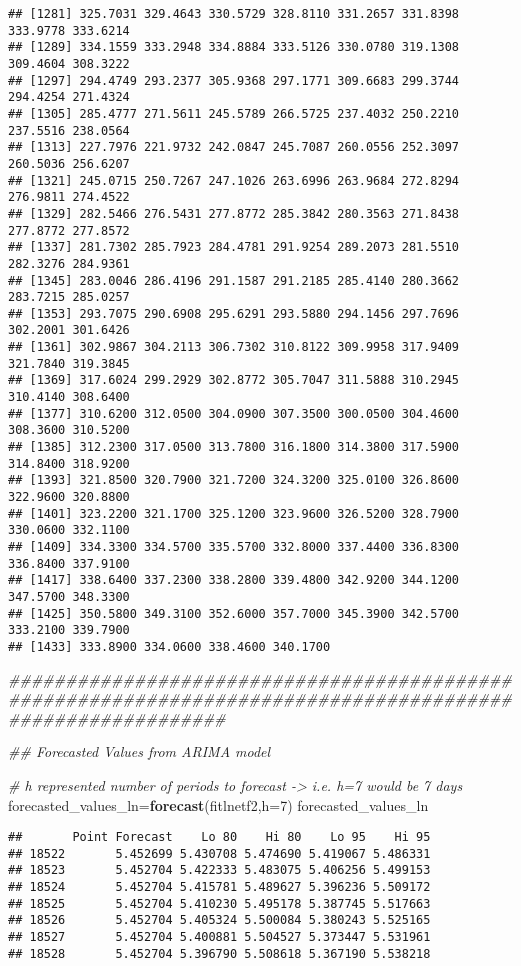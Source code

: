 \documentclass[
]{article}
\newenvironment{Shaded}{\begin{snugshade}}{\end{snugshade}}
\newcommand{\CommentTok}[1]{\textcolor[rgb]{0.56,0.35,0.01}{\textit{#1}}}
\newcommand{\DataTypeTok}[1]{\textcolor[rgb]{0.13,0.29,0.53}{#1}}
\newcommand{\DecValTok}[1]{\textcolor[rgb]{0.00,0.00,0.81}{#1}}
\newcommand{\KeywordTok}[1]{\textcolor[rgb]{0.13,0.29,0.53}{\textbf{#1}}}
\newcommand{\NormalTok}[1]{#1}
\begin{document}
\begin{verbatim}
## [1281] 325.7031 329.4643 330.5729 328.8110 331.2657 331.8398 333.9778 333.6214
## [1289] 334.1559 333.2948 334.8884 333.5126 330.0780 319.1308 309.4604 308.3222
## [1297] 294.4749 293.2377 305.9368 297.1771 309.6683 299.3744 294.4254 271.4324
## [1305] 285.4777 271.5611 245.5789 266.5725 237.4032 250.2210 237.5516 238.0564
## [1313] 227.7976 221.9732 242.0847 245.7087 260.0556 252.3097 260.5036 256.6207
## [1321] 245.0715 250.7267 247.1026 263.6996 263.9684 272.8294 276.9811 274.4522
## [1329] 282.5466 276.5431 277.8772 285.3842 280.3563 271.8438 277.8772 277.8572
## [1337] 281.7302 285.7923 284.4781 291.9254 289.2073 281.5510 282.3276 284.9361
## [1345] 283.0046 286.4196 291.1587 291.2185 285.4140 280.3662 283.7215 285.0257
## [1353] 293.7075 290.6908 295.6291 293.5880 294.1456 297.7696 302.2001 301.6426
## [1361] 302.9867 304.2113 306.7302 310.8122 309.9958 317.9409 321.7840 319.3845
## [1369] 317.6024 299.2929 302.8772 305.7047 311.5888 310.2945 310.4140 308.6400
## [1377] 310.6200 312.0500 304.0900 307.3500 300.0500 304.4600 308.3600 310.5200
## [1385] 312.2300 317.0500 313.7800 316.1800 314.3800 317.5900 314.8400 318.9200
## [1393] 321.8500 320.7900 321.7200 324.3200 325.0100 326.8600 322.9600 320.8800
## [1401] 323.2200 321.1700 325.1200 323.9600 326.5200 328.7900 330.0600 332.1100
## [1409] 334.3300 334.5700 335.5700 332.8000 337.4400 336.8300 336.8400 337.9100
## [1417] 338.6400 337.2300 338.2800 339.4800 342.9200 344.1200 347.5700 348.3300
## [1425] 350.5800 349.3100 352.6000 357.7000 345.3900 342.5700 333.2100 339.7900
## [1433] 333.8900 334.0600 338.4600 340.1700
\end{verbatim}

\begin{Shaded}
\begin{Highlighting}[]
\CommentTok{###########################################################################################################}
    
\CommentTok{## Forecasted Values from ARIMA model}

  \CommentTok{# h represented number of periods to forecast -> i.e. h=7 would be 7 days}
\NormalTok{    forecasted_values_ln=}\KeywordTok{forecast}\NormalTok{(fitlnetf2,}\DataTypeTok{h=}\DecValTok{7}\NormalTok{)}
\NormalTok{    forecasted_values_ln}
\end{Highlighting}
\end{Shaded}

\begin{verbatim}
##       Point Forecast    Lo 80    Hi 80    Lo 95    Hi 95
## 18522       5.452699 5.430708 5.474690 5.419067 5.486331
## 18523       5.452704 5.422333 5.483075 5.406256 5.499153
## 18524       5.452704 5.415781 5.489627 5.396236 5.509172
## 18525       5.452704 5.410230 5.495178 5.387745 5.517663
## 18526       5.452704 5.405324 5.500084 5.380243 5.525165
## 18527       5.452704 5.400881 5.504527 5.373447 5.531961
## 18528       5.452704 5.396790 5.508618 5.367190 5.538218
\end{verbatim}
\end{document}
